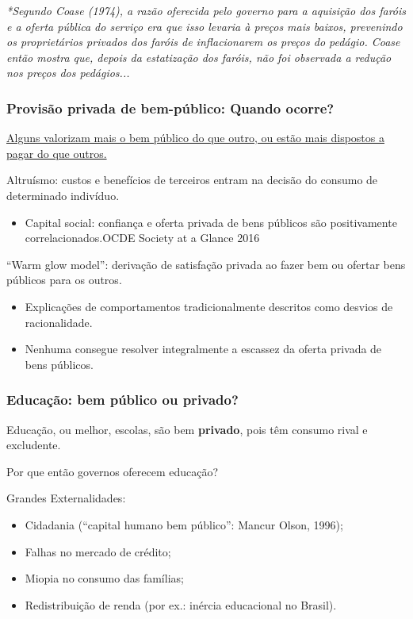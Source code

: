 \documentclass[a4paper,12pt]{article}[abntex2]
\begin{document}
\textit{*Segundo Coase (1974), a razão oferecida pelo governo para a aquisição dos faróis e a oferta pública do serviço era que isso levaria à preços mais baixos, prevenindo os proprietários privados dos faróis de inflacionarem os preços do pedágio. Coase então mostra que, depois da estatização dos faróis, não foi observada a redução nos preços dos pedágios...}

\subsubsection{\textbf{Provisão privada de bem-público: Quando ocorre?}}
\href{https://g1.globo.com/jornal-nacional/noticia/2024/01/20/moradores-se-unem-para-reconstruir-ponte-que-foi-destruida-por-enchente-no-rio-grande-do-sul.ghtml}{Alguns valorizam mais o bem público do que outro, ou estão mais dispostos a pagar do que outros.}

Altruísmo: custos e benefícios de terceiros entram na decisão do consumo de determinado indivíduo.\begin{itemize}
    \item Capital social: confiança e oferta privada de bens públicos são positivamente correlacionados.OCDE Society at a Glance 2016
\end{itemize}

“Warm glow model”: derivação de satisfação privada ao fazer bem ou ofertar bens públicos para os outros. \begin{itemize}
    \item Explicações de comportamentos tradicionalmente descritos como desvios de racionalidade.     
    \item Nenhuma consegue resolver integralmente a escassez da oferta privada de bens públicos.
\end{itemize}

\subsubsection{\textbf{Educação: bem público ou privado?}}
Educação, ou melhor, escolas, são bem \textbf{privado}, pois têm consumo rival e excludente. 

Por que então governos oferecem educação?

Grandes Externalidades:\begin{itemize}
    \item Cidadania (“capital humano bem público”: Mancur Olson, 1996);
    \item Falhas no mercado de crédito;
    \item Miopia no consumo das famílias;
    \item Redistribuição de renda (por ex.: inércia educacional no Brasil).
\end{itemize}
\end{document}
